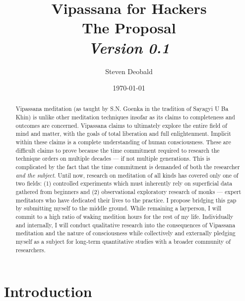 \documentclass[a4paper, amsfonts, amssymb, amsmath, reprint, showkeys, nofootinbib, twoside]{revtex4-1}
\begin{document}
\title{%
  \large{Vipassana for Hackers} \\
  \Huge{The Proposal} \\
  \large\textit{Version 0.1}
}
\author{Steven Deobald}
\date{\today}

\begin{abstract}
Vipassana meditation (as taught by S.N. Goenka in the tradition of Sayagyi U Ba Khin)
is unlike other meditation techniques insofar as its claims to completeness and
outcomes are concerned. Vipassana claims to ultimately explore the entire field of
mind and matter, with the goals of total liberation and full enlightenment. Implicit
within these claims is a complete understanding of human consciousness. These are
difficult claims to prove because the time commitment required to research the
technique orders on multiple decades --- if not multiple generations. This is complicated by the
fact that the time commitment is demanded of both the researcher \textit{and the
subject}. Until now, research on meditation of all kinds has covered only one of
two fields: (1) controlled experiments which must inherently rely on superficial data
gathered from beginners and (2) observational exploratory research of monks --- expert
meditators who have dedicated their lives to the practice. I propose bridging this
gap by submitting myself to the middle ground. While remaining a layperson, I will
commit to a high ratio of waking medition hours for the rest of my life. Individually
and internally, I will conduct qualitative research into the consequences of
Vipassana meditation and the nature of consciousness while collectively and
externally pledging myself as a subject for long-term quantitative
studies with a broader community of researchers.


\end{abstract}


\maketitle

\listoftodos

\section{Introduction}
\end{document}
